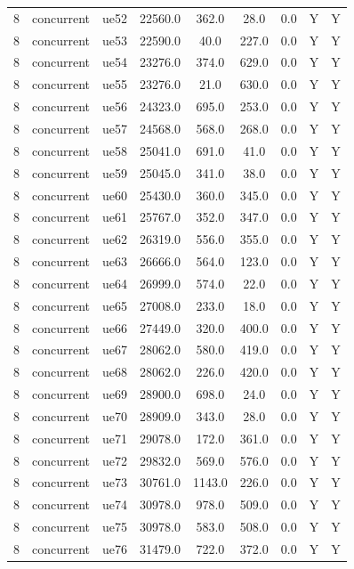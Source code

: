 \begin{table}[ht]
\begin{tabular}{|c|c|c|c|c|c|c|c|c|}
8 & concurrent & ue52 & 22560.0 & 362.0 & 28.0 & 0.0 & Y & Y \\
8 & concurrent & ue53 & 22590.0 & 40.0 & 227.0 & 0.0 & Y & Y \\
8 & concurrent & ue54 & 23276.0 & 374.0 & 629.0 & 0.0 & Y & Y \\
8 & concurrent & ue55 & 23276.0 & 21.0 & 630.0 & 0.0 & Y & Y \\
8 & concurrent & ue56 & 24323.0 & 695.0 & 253.0 & 0.0 & Y & Y \\
8 & concurrent & ue57 & 24568.0 & 568.0 & 268.0 & 0.0 & Y & Y \\
8 & concurrent & ue58 & 25041.0 & 691.0 & 41.0 & 0.0 & Y & Y \\
8 & concurrent & ue59 & 25045.0 & 341.0 & 38.0 & 0.0 & Y & Y \\
8 & concurrent & ue60 & 25430.0 & 360.0 & 345.0 & 0.0 & Y & Y \\
8 & concurrent & ue61 & 25767.0 & 352.0 & 347.0 & 0.0 & Y & Y \\
8 & concurrent & ue62 & 26319.0 & 556.0 & 355.0 & 0.0 & Y & Y \\
8 & concurrent & ue63 & 26666.0 & 564.0 & 123.0 & 0.0 & Y & Y \\
8 & concurrent & ue64 & 26999.0 & 574.0 & 22.0 & 0.0 & Y & Y \\
8 & concurrent & ue65 & 27008.0 & 233.0 & 18.0 & 0.0 & Y & Y \\
8 & concurrent & ue66 & 27449.0 & 320.0 & 400.0 & 0.0 & Y & Y \\
8 & concurrent & ue67 & 28062.0 & 580.0 & 419.0 & 0.0 & Y & Y \\
8 & concurrent & ue68 & 28062.0 & 226.0 & 420.0 & 0.0 & Y & Y \\
8 & concurrent & ue69 & 28900.0 & 698.0 & 24.0 & 0.0 & Y & Y \\
8 & concurrent & ue70 & 28909.0 & 343.0 & 28.0 & 0.0 & Y & Y \\
8 & concurrent & ue71 & 29078.0 & 172.0 & 361.0 & 0.0 & Y & Y \\
8 & concurrent & ue72 & 29832.0 & 569.0 & 576.0 & 0.0 & Y & Y \\
8 & concurrent & ue73 & 30761.0 & 1143.0 & 226.0 & 0.0 & Y & Y \\
8 & concurrent & ue74 & 30978.0 & 978.0 & 509.0 & 0.0 & Y & Y \\
8 & concurrent & ue75 & 30978.0 & 583.0 & 508.0 & 0.0 & Y & Y \\
8 & concurrent & ue76 & 31479.0 & 722.0 & 372.0 & 0.0 & Y & Y \\

\end{tabular}
\end{table}
